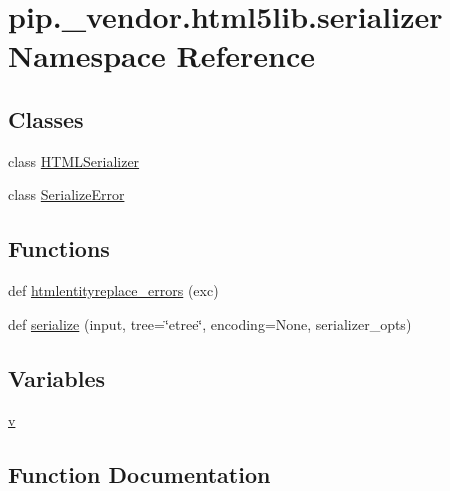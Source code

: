 \hypertarget{namespacepip_1_1__vendor_1_1html5lib_1_1serializer}{}\section{pip.\+\_\+vendor.\+html5lib.\+serializer Namespace Reference}
\label{namespacepip_1_1__vendor_1_1html5lib_1_1serializer}
\subsection*{Classes}
\begin{DoxyCompactItemize}
\item 
class \hyperlink{classpip_1_1__vendor_1_1html5lib_1_1serializer_1_1HTMLSerializer}{H\+T\+M\+L\+Serializer}
\item 
class \hyperlink{classpip_1_1__vendor_1_1html5lib_1_1serializer_1_1SerializeError}{Serialize\+Error}
\end{DoxyCompactItemize}
\subsection*{Functions}
\begin{DoxyCompactItemize}
\item 
def \hyperlink{namespacepip_1_1__vendor_1_1html5lib_1_1serializer_a38bfc70be42df9f446e8944d87b15c88}{htmlentityreplace\+\_\+errors} (exc)
\item 
def \hyperlink{namespacepip_1_1__vendor_1_1html5lib_1_1serializer_a8db95115d1fd7c943fe4b138e810ed5b}{serialize} (input, tree=\char`\"{}etree\char`\"{}, encoding=None, serializer\+\_\+opts)
\end{DoxyCompactItemize}
\subsection*{Variables}
\begin{DoxyCompactItemize}
\item 
\hyperlink{namespacepip_1_1__vendor_1_1html5lib_1_1serializer_a891d046d68d2a906ab8b95738a4aeccf}{v}
\end{DoxyCompactItemize}


\subsection{Function Documentation}
\mbox{\label{namespacepip_1_1__vendor_1_1html5lib_1_1serializer_a38bfc70be42df9f446e8944d87b15c88}} 
